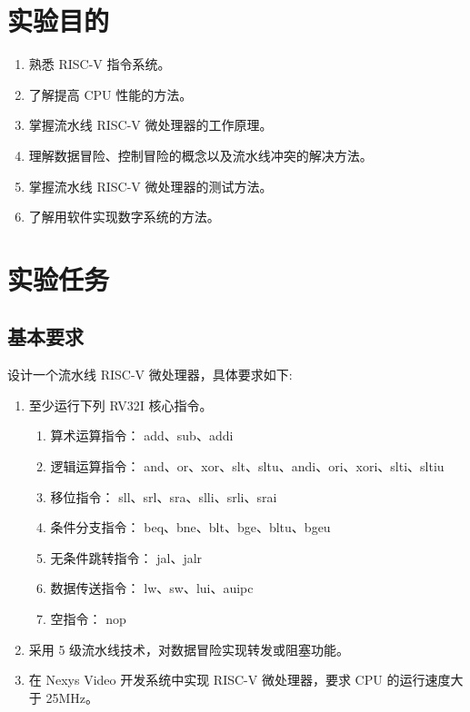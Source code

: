 \documentclass[12pt,a4paper]{article}
\begin{document}

\maketoc

\section{实验目的}
\begin{enumerate}
    \item 熟悉 RISC-V 指令系统。
    \item 了解提高 CPU 性能的方法。
    \item 掌握流水线 RISC-V 微处理器的工作原理。
    \item 理解数据冒险、控制冒险的概念以及流水线冲突的解决方法。
    \item 掌握流水线 RISC-V 微处理器的测试方法。
    \item 了解用软件实现数字系统的方法。
\end{enumerate}

\section{实验任务}
\subsection{基本要求}
    设计一个流水线 RISC-V 微处理器，具体要求如下:
    \begin{enumerate}
        \item 至少运行下列 RV32I 核心指令。
        \begin{enumerate}[label=\arabic*)]
            \item 算术运算指令： add、sub、addi
            \item 逻辑运算指令： and、or、xor、slt、sltu、andi、ori、xori、slti、sltiu
            \item 移位指令： sll、srl、sra、slli、srli、srai
            \item 条件分支指令： beq、bne、blt、bge、bltu、bgeu
            \item 无条件跳转指令： jal、jalr
            \item 数据传送指令： lw、sw、lui、auipc
            \item 空指令： nop
        \end{enumerate}
        \item 采用 5 级流水线技术，对数据冒险实现转发或阻塞功能。
        \item 在 Nexys Video 开发系统中实现 RISC-V 微处理器，要求 CPU 的运行速度大于 25MHz。
    \end{enumerate}
\end{document}
